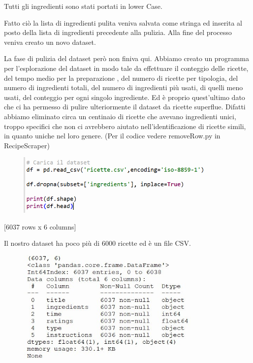 \documentclass[12pt]{report}
\begin{document}
Tutti gli ingredienti sono stati portati in lower Case.

Fatto ciò la lista di ingredienti pulita veniva salvata come stringa ed inserita al posto della lista di ingredienti precedente alla pulizia. Alla fine del processo veniva creato un novo dataset.

La fase di pulizia del dataset però non finiva qui. Abbiamo creato un programma per l’esplorazione del dataset in modo tale da effettuare il conteggio delle ricette, del tempo medio per la preparazione , del numero di ricette per tipologia, del numero di ingredienti totali, del numero di ingredienti più usati, di quelli meno usati, del conteggio per ogni singolo ingrediente. Ed è proprio quest’ultimo dato che ci ha permesso di pulire ulteriormente il dataset da ricette superflue. Difatti abbiamo eliminato circa un centinaio di ricette che avevano ingredienti unici, troppo specifici che non ci avrebbero aiutato nell’identificazione di ricette simili, in quanto uniche nel loro genere. (Per il codice vedere removeRow.py in RecipeScraper)

\begin{figure}[H]
        \centering
        {\includegraphics[width=0.9\textwidth]{img/img4.jpg}}
\end{figure}
[6037 rows x 6 columns]

 Il nostro dataset ha poco più di 6000 ricette ed è un file CSV.

\begin{figure}[H]
        \centering
        {\includegraphics[width=0.8\textwidth]{img/img5.jpg}}
\end{figure}
\end{document}

